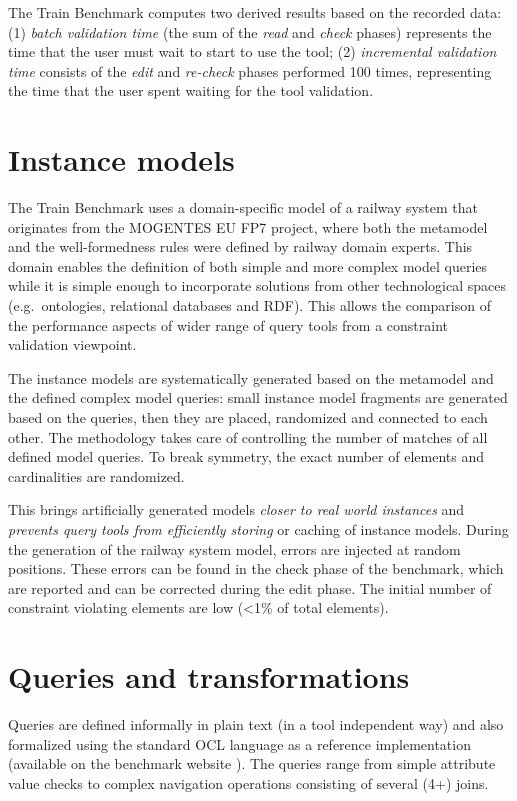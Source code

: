 The Train Benchmark computes two derived results based on the recorded data:
(1) \emph{batch validation time} (the sum of the \emph{read} and \emph{check} phases)
represents the time that the user must wait to start to use the tool; (2)
\emph{incremental validation time} consists of the \emph{edit} and
\emph{re-check} phases performed 100 times, representing the time that the
user spent waiting for the tool validation.


\section{Instance models}
The Train Benchmark uses a domain-specific model of a railway system that
originates from the \mbox{MOGENTES} EU FP7 project, where both the metamodel and the
well-formedness rules were defined by railway domain experts. This domain
enables the definition of both simple and more complex model queries while it is
simple enough to incorporate solutions from other technological spaces
(e.g.\ ontologies, relational databases and RDF). This allows the comparison of
the performance aspects of wider range of query tools from a constraint
validation viewpoint.

The instance models are systematically generated based on the metamodel and the
defined complex model queries: small instance model fragments are generated
based on the queries, then they are placed, randomized and connected to each
other. The methodology takes care of controlling the number of matches of all
defined model queries. To break symmetry, the exact number of elements and
cardinalities are randomized.
 
This brings artificially generated models \emph{closer to real world instances}
and \emph{prevents query tools from efficiently storing} or caching of instance
models. During the generation of the railway system model, errors are injected
at random positions. These errors can be found in the check phase of the
benchmark, which are reported and can be corrected during the edit phase. The
initial number of constraint violating elements are low (<1\% of total
elements).
 
\section{Queries and transformations}
Queries are defined informally in plain text (in a tool independent way) and
also formalized using the standard OCL language as a reference implementation
(available on the benchmark website \cite{TBwebsite}). The queries range from
simple attribute value checks to complex navigation operations consisting of
several (4+) joins.

